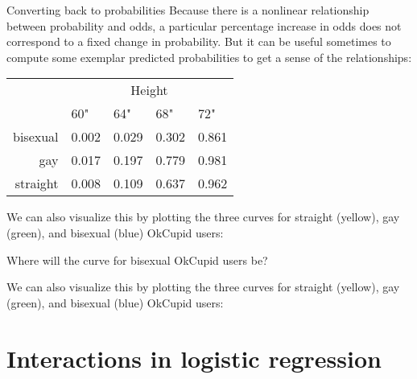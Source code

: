 \documentclass{beamer}\usepackage[]{graphicx}\usepackage[]{color}
\newenvironment{knitrout}{}{} %
\begin{document}
\begin{darkframes}
    \begin{frame}{Converting back to probabilities}
      Because there is a nonlinear relationship between probability and odds, a particular percentage increase in odds does not correspond to a fixed change in probability. But it can be useful sometimes to compute some exemplar predicted probabilities to get a sense of the relationships:

      

      \begin{center}
        \begin{tabular}{r|llll}
          & \multicolumn{4}{c}{Height} \\
          & 60" & 64" & 68" & 72" \\
          \hline
          bisexual
            & 0.002
            & 0.029
            & 0.302
            & 0.861
            \\
          gay
            & 0.017
            & 0.197
            & 0.779
            & 0.981
            \\
          straight
            & 0.008
            & 0.109
            & 0.637
            & 0.962
            \\
        \end{tabular}
      \end{center}
    \end{frame}

    \begin{frame}
      We can also visualize this by plotting the three curves for straight (yellow), gay (green), and bisexual (blue) OkCupid users:
\begin{knitrout}


\end{knitrout}
      Where will the curve for bisexual OkCupid users be?
    \end{frame}

    \begin{frame}
      We can also visualize this by plotting the three curves for straight (yellow), gay (green), and bisexual (blue) OkCupid users:
\begin{knitrout}


\end{knitrout}
    \end{frame}

    \section{Interactions in logistic regression}


\end{darkframes}
\end{document}
